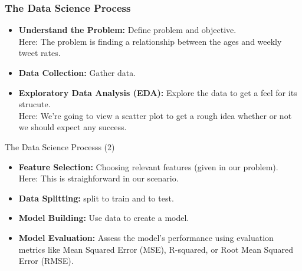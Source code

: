 \documentclass{beamer}
\newcounter{slidenum}
\begin{document}
\begin{frame}
	\frametitle{The Data Science Process}
	\begin{itemize}
	\item \textbf{Understand the Problem:} Define problem and objective.\\

		Here: The problem is finding a relationship between the ages
		and weekly tweet rates.
  \item \textbf{Data Collection:} Gather data.\\
  \item \textbf{Exploratory Data Analysis (EDA):} Explore the data to get a
	  feel for its strucute. \\
	  Here: We're going to view a scatter plot to get a rough idea whether
	  or not we should expect any success.
\end{itemize}
\end{frame}

\begin{frame}{The Data Science Processs (2)}
	\begin{itemize}	
  \item \textbf{Feature Selection:} Choosing relevant features (given in our
	  problem).\\

	  Here: This is straighforward in our scenario. 
  \item \textbf{Data Splitting:} split to train and to test.

  \item \textbf{Model Building:} Use data to create a model. 
  \item \textbf{Model Evaluation:} Assess the model's performance using evaluation metrics like Mean Squared Error (MSE), R-squared, or Root Mean Squared Error (RMSE).
	  \end{itemize}
\end{frame}
\end{document}
